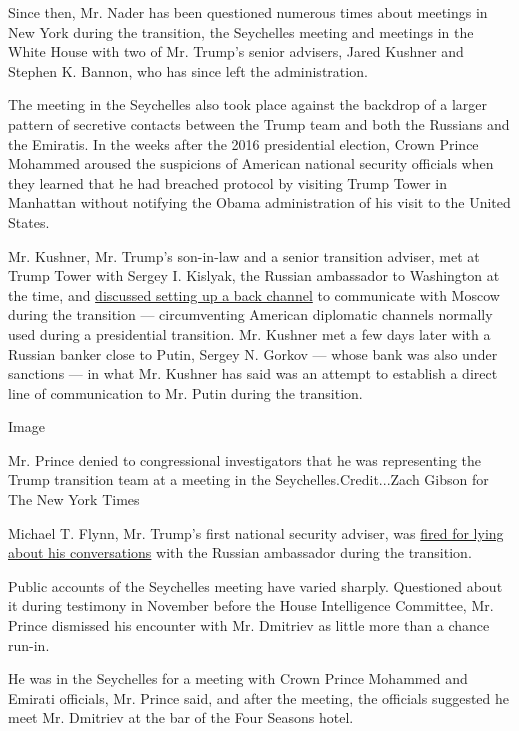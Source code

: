 Since then, Mr. Nader has been questioned numerous times about meetings
in New York during the transition, the Seychelles meeting and meetings
in the White House with two of Mr. Trump's senior advisers, Jared
Kushner and Stephen K. Bannon, who has since left the administration.

The meeting in the Seychelles also took place against the backdrop of a
larger pattern of secretive contacts between the Trump team and both the
Russians and the Emiratis. In the weeks after the 2016 presidential
election, Crown Prince Mohammed aroused the suspicions of American
national security officials when they learned that he had breached
protocol by visiting Trump Tower in Manhattan without notifying the
Obama administration of his visit to the United States.

Mr. Kushner, Mr. Trump's son-in-law and a senior transition adviser, met
at Trump Tower with Sergey I. Kislyak, the Russian ambassador to
Washington at the time, and
\href{https://www.nytimes.com/2017/05/26/us/politics/kushner-talked-to-russian-envoy-about-creating-secret-channel-with-kremlin.html}{discussed
setting up a back channel} to communicate with Moscow during the
transition --- circumventing American diplomatic channels normally used
during a presidential transition. Mr. Kushner met a few days later with
a Russian banker close to Putin, Sergey N. Gorkov --- whose bank was
also under sanctions --- in what Mr. Kushner has said was an attempt to
establish a direct line of communication to Mr. Putin during the
transition.

Image

Mr. Prince denied to congressional investigators that he was
representing the Trump transition team at a meeting in the
Seychelles.Credit...Zach Gibson for The New York Times

Michael T. Flynn, Mr. Trump's first national security adviser, was
\href{https://www.nytimes.com/2017/12/02/us/politics/trump-michael-flynn.html}{fired
for lying about his conversations} with the Russian ambassador during
the transition.

Public accounts of the Seychelles meeting have varied sharply.
Questioned about it during testimony in November before the House
Intelligence Committee, Mr. Prince dismissed his encounter with Mr.
Dmitriev as little more than a chance run-in.

He was in the Seychelles for a meeting with Crown Prince Mohammed and
Emirati officials, Mr. Prince said, and after the meeting, the officials
suggested he meet Mr. Dmitriev at the bar of the Four Seasons hotel.

